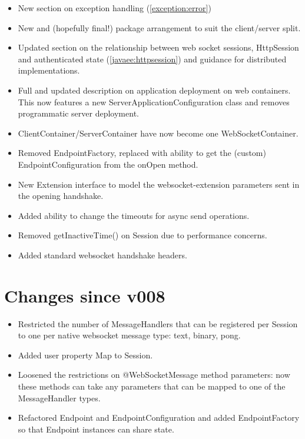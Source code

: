 \begin{itemize}
\item New section on exception handling (\ref{exception:error})
\item New and (hopefully final!) package arrangement to suit the client/server split.
\item Updated section on the relationship between web socket sessions, HttpSession and authenticated state (\ref{javaee:httpsession}) and guidance for distributed implementations.
\item Full and updated description on application deployment on web containers. This now features a new ServerApplicationConfiguration class and removes programmatic server deployment. 
\item ClientContainer/ServerContainer have now become one WebSocketContainer.
\item Removed EndpointFactory, replaced with ability to get the (custom) EndpointConfiguration from the onOpen method.
\item New Extension interface to model the websocket-extension parameters sent in the opening handshake.
\item Added ability to change the timeouts for async send operations.
\item Removed getInactiveTime() on Session due to performance concerns.
\item Added standard websocket handshake headers.
\end{itemize}

\section*{Changes since v008}
\begin{itemize}
\item Restricted the number of MessageHandlers that can be registered per Session to one per native websocket message type: text, binary, pong.
\item Added user property Map to Session.
\item Loosened the restrictions on @WebSocketMessage method parameters: now these methods can take any parameters that can be mapped to one of the MessageHandler types.
\item Refactored Endpoint and EndpointConfiguration and added EndpointFactory so that Endpoint instances can share state.
\end{itemize}

